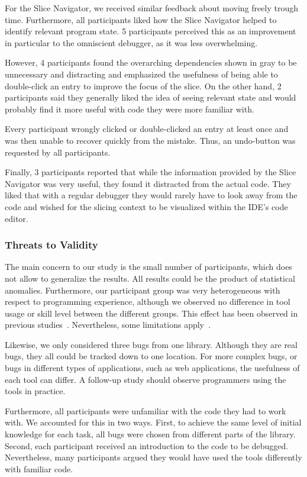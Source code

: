 For the Slice Navigator, we received similar feedback about moving freely trough time.
Furthermore, all participants liked how the Slice Navigator helped to identify relevant program state.
5 participants perceived this as an improvement in particular to the omniscient debugger, as it was less overwhelming.

However, 4 participants found the overarching dependencies shown in gray to be unnecessary and distracting and emphasized the usefulness of being able to double-click an entry to improve the focus of the slice.
On the other hand, 2 participants said they generally liked the idea of seeing relevant state and would probably find it more useful with code they were more familiar with.

Every participant wrongly clicked or double-clicked an entry at least once and was then unable to recover quickly from the mistake.
Thus, an undo-button was requested by all participants.

Finally, 3 participants reported that while the information provided by the Slice Navigator was very useful, they found it distracted from the actual code.
They liked that with a regular debugger they would rarely have to look away from the code and wished for the slicing context to be visualized within the IDE's code editor.

\subsubsection{Threats to Validity}

The main concern to our study is the small number of participants, which does not allow to generalize the results.
All results could be the product of statistical anomalies.
Furthermore, our participant group was very heterogeneous with respect to programming experience,
although we observed no difference in tool usage or skill level between the different groups.
This effect has been observed in previous studies~\cite{host_using_2000, salman_are_2015}.
Nevertheless, some limitations apply~\cite{mcmeekin_significance_2009}.

Likewise, we only considered three bugs from one library.
Although they are real bugs, they all could be tracked down to one location.
For more complex bugs, or bugs in different types of applications, such as web applications, the usefulness of each tool can differ.
A follow-up study should observe programmers using the tools in practice.

Furthermore, all participants were unfamiliar with the code they had to work with.
We accounted for this in two ways.
First, to achieve the same level of initial knowledge for each task, all bugs were chosen from different parts of the library.
Second, each participant received an introduction to the code to be debugged.
Nevertheless, many participants argued they would have used the tools differently with familiar code.

\tmpEnd